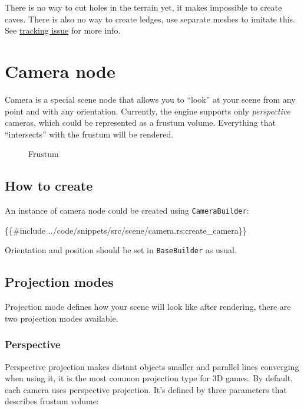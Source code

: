 \documentclass[
]{book}
\newenvironment{Shaded}{\begin{snugshade}}{\end{snugshade}}
\newcommand{\NormalTok}[1]{#1}
\theoremstyle{definition}
\theoremstyle{definition}
\theoremstyle{definition}
\theoremstyle{definition}
\theoremstyle{remark}
\begin{document}
There is no way to cut holes in the terrain yet, it makes impossible to create caves. There is also no way to create ledges, use separate meshes to imitate this. See \href{https://github.com/FyroxEngine/Fyrox/issues/351}{tracking issue} for more info.

\section{Camera node}\label{camera-node}

Camera is a special scene node that allows you to ``look'' at your scene from any point and with any orientation. Currently, the engine supports only \emph{perspective} cameras, which could be represented as a frustum volume. Everything that ``intersects'' with the frustum will be rendered.

\begin{figure}
\centering

\caption{Frustum}
\end{figure}

\subsection{How to create}\label{how-to-create-6}

An instance of camera node could be created using \texttt{CameraBuilder}:

\begin{Shaded}
\begin{Highlighting}[]
\NormalTok{\{\{\#include ../code/snippets/src/scene/camera.rs:create\_camera\}\}}
\end{Highlighting}
\end{Shaded}

Orientation and position should be set in \texttt{BaseBuilder} as usual.

\subsection{Projection modes}\label{projection-modes}

Projection mode defines how your scene will look like after rendering, there are two projection modes available.

\subsubsection{Perspective}\label{perspective}

Perspective projection makes distant objects smaller and parallel lines converging when using it, it is the most common projection type for 3D games. By default, each camera uses perspective projection. It's defined by three parameters that describes frustum volume:
\end{document}
